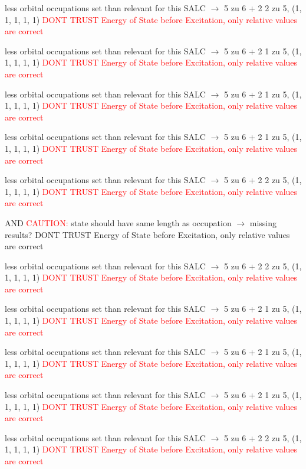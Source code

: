 \documentclass[12pt,a4paper]{article}
\begin{document}
less orbital occupations set than relevant for this SALC $\rightarrow$ 
5 zu 6 + 2 
2 zu 5, (1, 1, 1, 1, 1) 
\textcolor{red}{DONT TRUST \glqq{}Energy of State before Excitation\grqq{}, only relative values are correct}

less orbital occupations set than relevant for this SALC $\rightarrow$ 
5 zu 6 + 2 
1 zu 5, (1, 1, 1, 1, 1) 
\textcolor{red}{DONT TRUST \glqq{}Energy of State before Excitation\grqq{}, only relative values are correct}

less orbital occupations set than relevant for this SALC $\rightarrow$ 
5 zu 6 + 2 
1 zu 5, (1, 1, 1, 1, 1) 
\textcolor{red}{DONT TRUST \glqq{}Energy of State before Excitation\grqq{}, only relative values are correct}

less orbital occupations set than relevant for this SALC $\rightarrow$ 
5 zu 6 + 2 
1 zu 5, (1, 1, 1, 1, 1) 
\textcolor{red}{DONT TRUST \glqq{}Energy of State before Excitation\grqq{}, only relative values are correct}

less orbital occupations set than relevant for this SALC $\rightarrow$ 
5 zu 6 + 2 
2 zu 5, (1, 1, 1, 1, 1) 
\textcolor{red}{DONT TRUST \glqq{}Energy of State before Excitation\grqq{}, only relative values are correct}

 AND 	\textcolor{red}{CAUTION:} state should have same length as occupation $\rightarrow$ missing results?
	DONT TRUST \glqq{}Energy of State before Excitation\grqq{}, only relative values are correct

less orbital occupations set than relevant for this SALC $\rightarrow$ 
5 zu 6 + 2 
2 zu 5, (1, 1, 1, 1, 1) 
\textcolor{red}{DONT TRUST \glqq{}Energy of State before Excitation\grqq{}, only relative values are correct}

less orbital occupations set than relevant for this SALC $\rightarrow$ 
5 zu 6 + 2 
1 zu 5, (1, 1, 1, 1, 1) 
\textcolor{red}{DONT TRUST \glqq{}Energy of State before Excitation\grqq{}, only relative values are correct}

less orbital occupations set than relevant for this SALC $\rightarrow$ 
5 zu 6 + 2 
1 zu 5, (1, 1, 1, 1, 1) 
\textcolor{red}{DONT TRUST \glqq{}Energy of State before Excitation\grqq{}, only relative values are correct}

less orbital occupations set than relevant for this SALC $\rightarrow$ 
5 zu 6 + 2 
1 zu 5, (1, 1, 1, 1, 1) 
\textcolor{red}{DONT TRUST \glqq{}Energy of State before Excitation\grqq{}, only relative values are correct}

less orbital occupations set than relevant for this SALC $\rightarrow$ 
5 zu 6 + 2 
2 zu 5, (1, 1, 1, 1, 1) 
\textcolor{red}{DONT TRUST \glqq{}Energy of State before Excitation\grqq{}, only relative values are correct}
\end{document}
